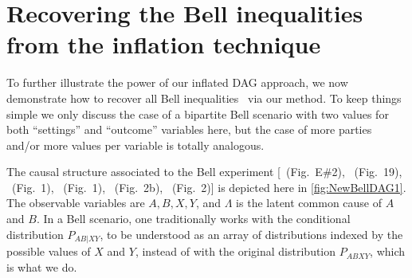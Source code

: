 \section{Recovering the Bell inequalities from the inflation technique}
\label{sec:Bellscenarios}


To further illustrate the power of our inflated DAG approach, we now demonstrate how to recover all Bell inequalities~\cite{Brunner2013Bell,bell1966lhvm,CHSHOriginal} via our method. To keep things simple we only discuss the case of a bipartite Bell scenario with two values for both ``settings'' and ``outcome'' variables here, but the case of more parties and/or more values per variable is totally analogous.

The causal structure associated to the Bell \cite{bell1964einstein,Brunner2013Bell,bell1966lhvm,CHSHOriginal} experiment [\citealp{pusey2014gdag}~(Fig.~E\#2), \citealp{WoodSpekkens}~(Fig.~19), \citealp{chaves2014novel}~(Fig.~1), \citealp{BeyondBellII}~(Fig.~1), \citealp{wolfe2015nonconvexity}~(Fig.~2b), \citealp{steeg2011relaxation}~(Fig.~2)] is depicted here in \cref{fig:NewBellDAG1}. The observable variables are $A,B,X,Y$, and $\Lambda$ is the latent common cause of $A$ and $B$. In a Bell scenario, one traditionally works with the conditional distribution $P_{AB|XY}$, to be understood as an array of distributions indexed by the possible values of $X$ and $Y$, instead of with the original distribution $P_{ABXY}$, which is what we do.

